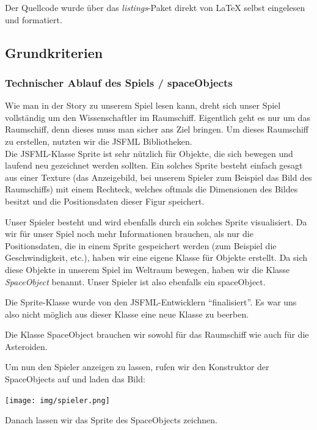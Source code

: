 \documentclass[12pt,a4paper]{scrartcl}
\newcommand{\q}[1]{``#1''}
\begin{document}
Der Quellcode wurde über das \textit{listings}-Paket direkt von LaTeX selbst eingelesen und formatiert.

\subsection{Grundkriterien}

\subsubsection{Technischer Ablauf des Spiels / spaceObjects}
Wie man in der Story zu unserem Spiel lesen kann, dreht sich unser Spiel vollständig um den Wissenschaftler im Raumschiff. Eigentlich geht es nur um das Raumschiff, denn dieses muss man sicher ans Ziel bringen.
Um dieses Raumschiff zu erstellen, nutzten wir die JSFML Bibliotheken.	\\

Die JSFML-Klasse Sprite ist sehr nützlich für Objekte, die sich bewegen und laufend neu gezeichnet werden sollten.
Ein solches Sprite besteht einfach gesagt aus einer Texture (das Anzeigebild, bei unserem Spieler zum Beispiel das Bild des Raumschiffs) mit einem Rechteck,
welches oftmals die Dimensionen des Bildes besitzt und die Positionsdaten dieser Figur speichert.

Unser Spieler besteht und wird ebenfalls durch ein solches Sprite visualisiert.
Da wir für unser Spiel noch mehr Informationen brauchen, als nur die Positionsdaten, die in einem
Sprite gespeichert werden (zum Beispiel die Geschwindigkeit, etc.), haben wir eine eigene Klasse für Objekte erstellt. Da sich diese Objekte
in unserem Spiel im Weltraum bewegen, haben wir die Klasse \textit{SpaceObject} benannt. Unser Spieler ist also ebenfalls ein spaceObject.

Die Sprite-Klasse wurde von den JSFML-Entwicklern \q{finalisiert}. Es war uns also nicht
möglich aus dieser Klasse eine neue Klasse zu beerben.


Die Klasse SpaceObject brauchen wir sowohl für das Raumschiff wie auch für die Asteroiden.

Um nun den Spieler anzeigen zu lassen, rufen wir den Konstruktor der SpaceObjects auf und laden das Bild: 	\\

\begin{center}
\texttt{[image: img/spieler.png]}
\end{center}

Danach lassen wir das Sprite des SpaceObjects zeichnen.
\end{document}
